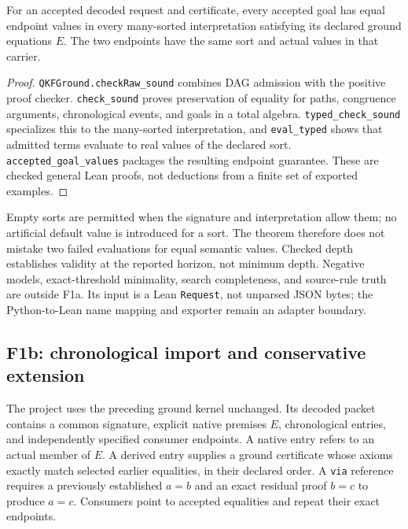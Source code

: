 \begin{theorem}\label{thm:formalground}
For an accepted decoded request and certificate, every accepted goal has equal endpoint values in every many-sorted interpretation satisfying its declared ground equations $E$. The two endpoints have the same sort and actual values in that carrier.
\end{theorem}
\begin{proof}
\texttt{QKFGround.checkRaw\_sound} combines DAG admission with the positive proof checker. \texttt{check\_sound} proves preservation of equality for paths, congruence arguments, chronological events, and goals in a total algebra. \texttt{typed\_check\_sound} specializes this to the many-sorted interpretation, and \texttt{eval\_typed} shows that admitted terms evaluate to real values of the declared sort. \texttt{accepted\_goal\_values} packages the resulting endpoint guarantee. These are checked general Lean proofs, not deductions from a finite set of exported examples.
\end{proof}

Empty sorts are permitted when the signature and interpretation allow them; no artificial default value is introduced for a sort. The theorem therefore does not mistake two failed evaluations for equal semantic values. Checked depth establishes validity at the reported horizon, not minimum depth. Negative models, exact-threshold minimality, search completeness, and source-rule truth are outside F1a. Its input is a Lean \texttt{Request}, not unparsed JSON bytes; the Python-to-Lean name mapping and exporter remain an adapter boundary.

\subsection{F1b: chronological import and conservative extension}
The project  uses the preceding ground kernel unchanged. Its decoded packet contains a common signature, explicit native premises $E$, chronological entries, and independently specified consumer endpoints. A native entry refers to an actual member of $E$. A derived entry supplies a ground certificate whose axioms exactly match selected earlier equalities, in their declared order. A \texttt{via} reference requires a previously established $a=b$ and an exact residual proof $b=c$ to produce $a=c$. Consumers point to accepted equalities and repeat their exact endpoints.

